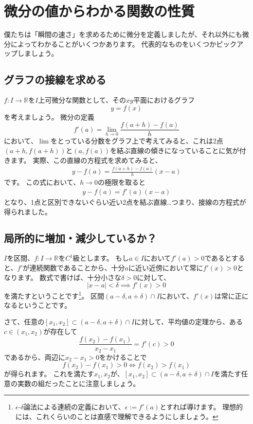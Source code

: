 \section{微分の値からわかる関数の性質}

僕たちは「瞬間の速さ」を求めるために微分を定義しましたが、それ以外にも微分によってわかることがいくつかあります。
代表的なものをいくつかピックアップしましょう。

\subsection{グラフの接線を求める}

$f:I\to\mathbb{R}$を$I$上可微分な関数として、その$xy$平面におけるグラフ
\[
  y=f(x)
\]
を考えましょう。
微分の定義
\[
  f'(a)=\lim_{h\to0}\frac{f(a+h)-f(a)}{h}
\]
において、$\lim$をとっている分数をグラフ上で考えてみると、これは2点$(a+h,f(a+h))$と$(a,f(a))$を結ぶ直線の傾きになっていることに気が付きます。
実際、この直線の方程式を求めてみると、
\begin{align*}
  y-f(a)=\frac{f(a+h)-f(a)}{h}(x-a)
\end{align*}
です。
この式において、$h\to0$の極限を取ると
\begin{align*}
  y-f(a)=f'(a)(x-a)
\end{align*}
となり、1点と区別できないぐらい近い2点を結ぶ直線…つまり、接線の方程式が得られました。



\subsection{局所的に増加・減少しているか？}

$I$を区間、$f:I\to\mathbb{R}$を$C^1$級とします。
もし$a\in I$において$f'(a)>0$であるとすると、$f'$が連続関数であることから、十分$a$に近い近傍において常に$f'(x)>0$となります。
数式で書けば、十分小さな$\delta>0$に対して、
\[
  |x-a|<\delta\implies f'(x)>0
\]
を満たすということです\footnote{
  $\epsilon\text{-}\delta$論法による連続の定義において、$\epsilon:=f'(a)$とすれば導けます。
  理想的には、これくらいのことは直感で理解できるようにしましょう。
}。
区間$(a-\delta,a+\delta)\cap I$において、$f'(x)$は常に正になるということです。

さて、任意の$[x_1,x_2]\subset(a-\delta,a+\delta)\cap I$に対して、平均値の定理から、ある$c\in(x_1,x_2)$が存在して
\[
  \frac{f(x_2)-f(x_1)}{x_2-x_1}=f'(c)>0
\]
であるから、両辺に$x_2-x_1>0$をかけることで
\[
  f(x_2)-f(x_1)>0\iff f(x_2)>f(x_1)
\]
が得られます。
これを満たす$x_1,x_2$が、$[x_1,x_2]\subset(a-\delta,a+\delta)\cap I$を満たす任意の実数の組だったことに注意しましょう。

